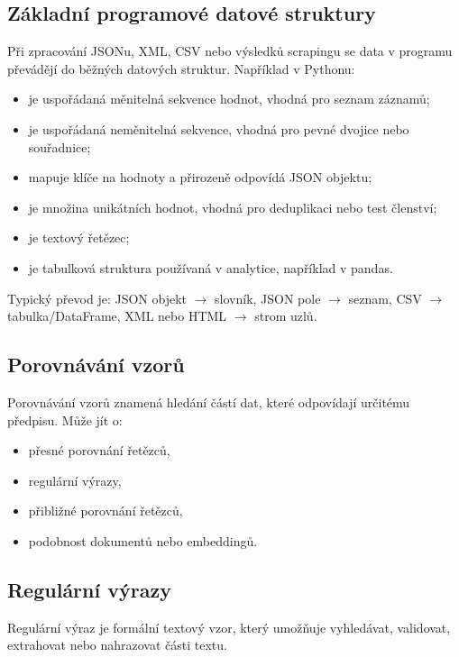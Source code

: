 \subsection{Základní programové datové struktury}
Při zpracování JSONu, XML, CSV nebo výsledků scrapingu se data v programu převádějí do běžných datových
struktur. Například v Pythonu:
\begin{itemize}
    \item {} je uspořádaná měnitelná sekvence hodnot, vhodná pro seznam záznamů;
    \item {} je uspořádaná neměnitelná sekvence, vhodná pro pevné dvojice nebo souřadnice;
    \item {} mapuje klíče na hodnoty a přirozeně odpovídá JSON objektu;
    \item {} je množina unikátních hodnot, vhodná pro deduplikaci nebo test členství;
    \item {} je textový řetězec;
    \item {} je tabulková struktura používaná v analytice, například v pandas.
\end{itemize}

Typický převod je: JSON objekt \(\rightarrow\) slovník, JSON pole \(\rightarrow\) seznam, CSV
\(\rightarrow\) tabulka/DataFrame, XML nebo HTML \(\rightarrow\) strom uzlů.

\subsection{Porovnávání vzorů}

Porovnávání vzorů znamená hledání částí dat, které odpovídají určitému předpisu. Může jít o:
\begin{itemize}
    \item přesné porovnání řetězců,
    \item regulární výrazy,
    \item přibližné porovnání řetězců,
    \item podobnost dokumentů nebo embeddingů.
\end{itemize}

\subsection{Regulární výrazy}

Regulární výraz je formální textový vzor, který umožňuje vyhledávat, validovat, extrahovat nebo nahrazovat
části textu.

